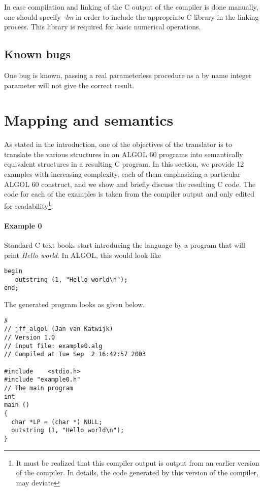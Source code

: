 \documentclass[11pt]{article}
\begin{document}
In case compilation and linking of the C output of the compiler is done manually,
one should specify {\em -lm} in order to include the 
appropriate C library in the linking process. This library is required for basic numerical operations.
\subsection{Known bugs}
One bug is known, passing a real parameterless procedure as a by name
integer parameter will not give the correct result.
\section{Mapping and semantics}
As stated in the introduction, one of the objectives of the translator is to 
translate the various structures in an ALGOL 60 programs into semantically
equivalent structures in a resulting C program.
In this section, we provide 12 examples with increasing complexity,
each of them emphasizing a 
particular ALGOL 60 construct, and we show and briefly discuss
the resulting C code. The code for each of the examples is taken from
the compiler output and only edited for readability\footnote{It must be realized
that this compiler output is output from an earlier version of the compiler.
In details, the code generated by this version of the compiler, may deviate}.
\paragraph{Example 0}
Standard C text books start introducing the language by a program that will
print {\em Hello world}. In ALGOL, this would look like
{\footnotesize
\begin{verbatim}
begin
   outstring (1, "Hello world\n");
end;
\end{verbatim}
}
The generated program looks as given below.
{\footnotesize
\begin{verbatim}
#
// jff_algol (Jan van Katwijk)
// Version 1.0
// input file: example0.alg
// Compiled at Tue Sep  2 16:42:57 2003

#include	<stdio.h>
#include "example0.h"
// The main program
int
main ()
{
  char *LP = (char *) NULL;
  outstring (1, "Hello world\n");
}
\end{verbatim}
}
\end{document}
